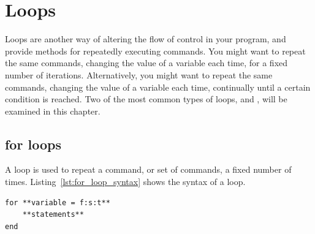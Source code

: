 \chapter{Loops} \label{ch:loops}
	
Loops are another way of altering the flow of control in your program, and provide methods for repeatedly executing commands. You might want to repeat the same commands, changing the value of a variable each time, for a fixed number of iterations. Alternatively, you might want to repeat the same commands, changing the value of a variable each time, continually until a certain condition is reached. Two of the most common types of loops,  and , will be examined in this chapter.

\section{for loops}
A  loop is used to repeat a command, or set of commands, a fixed number of times. Listing~\ref{lst:for_loop_syntax} shows the syntax of a  loop.
\begin{lstlisting}[caption={Syntax of a \mcode{for} loop},label=lst:for_loop_syntax]
for **variable = f:s:t**
	**statements**
end
\end{lstlisting}

